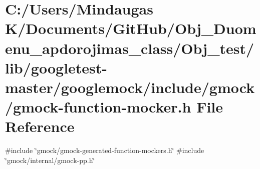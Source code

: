 \hypertarget{_obj__test_2lib_2googletest-master_2googlemock_2include_2gmock_2gmock-function-mocker_8h}{}\section{C\+:/\+Users/\+Mindaugas K/\+Documents/\+Git\+Hub/\+Obj\+\_\+\+Duomenu\+\_\+apdorojimas\+\_\+class/\+Obj\+\_\+test/lib/googletest-\/master/googlemock/include/gmock/gmock-\/function-\/mocker.h File Reference}
\label{_obj__test_2lib_2googletest-master_2googlemock_2include_2gmock_2gmock-function-mocker_8h}
{\ttfamily \#include \char`\"{}gmock/gmock-\/generated-\/function-\/mockers.\+h\char`\"{}}\newline
{\ttfamily \#include \char`\"{}gmock/internal/gmock-\/pp.\+h\char`\"{}}\newline
